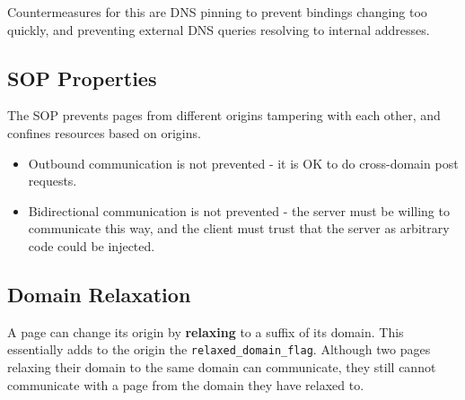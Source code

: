 \documentclass[11pt]{article}
\begin{document}
Countermeasures for this are DNS pinning to prevent bindings changing too quickly, and preventing external DNS queries resolving to internal addresses.

\subsection{SOP Properties}
The SOP prevents pages from different origins tampering with each other, and confines resources based on origins.
\begin{itemize}
  \item Outbound communication is not prevented - it is OK to do cross-domain post requests.
  \item Bidirectional communication is not prevented - the server must be willing to communicate this way, and the client must trust that the server as arbitrary code could be injected.
\end{itemize}

\subsection{Domain Relaxation}
A page can change its origin by \textbf{relaxing} to a suffix of its domain.
This essentially adds to the origin the \texttt{relaxed\_domain\_flag}.
Although two pages relaxing their domain to the same domain can communicate, they still cannot communicate with a page from the domain they have relaxed to.
\end{document}
